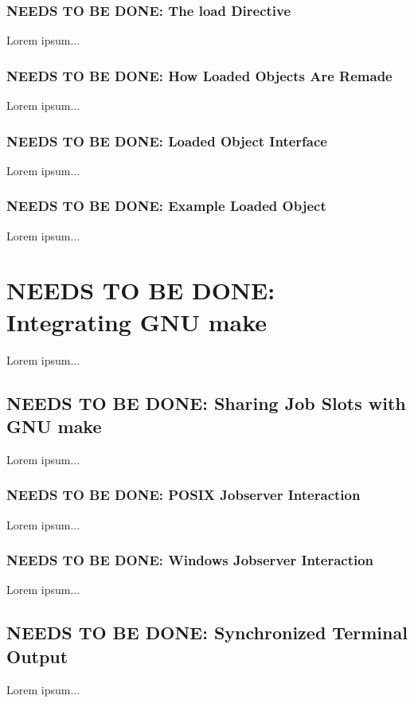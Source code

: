 \documentclass{charun}
\begin{document}
\begin{multicols*}{2}
\color{gray}
\subsubsection{NEEDS TO BE DONE: The load Directive}
Lorem ipsum...
\color{black}

\color{gray}
\subsubsection{NEEDS TO BE DONE: How Loaded Objects Are Remade}
Lorem ipsum...
\color{black}

\color{gray}
\subsubsection{NEEDS TO BE DONE: Loaded Object Interface}
Lorem ipsum...
\color{black}

\color{gray}
\subsubsection{NEEDS TO BE DONE: Example Loaded Object}
Lorem ipsum...
\color{black}


\color{gray}
\section{NEEDS TO BE DONE: Integrating GNU make}
Lorem ipsum...
\color{black}


\color{gray}
\subsection{NEEDS TO BE DONE: Sharing Job Slots with GNU make}
Lorem ipsum...
\color{black}

\color{gray}
\subsubsection{NEEDS TO BE DONE: POSIX Jobserver Interaction}
Lorem ipsum...
\color{black}

\color{gray}
\subsubsection{NEEDS TO BE DONE: Windows Jobserver Interaction}
Lorem ipsum...
\color{black}

\color{gray}
\subsection{NEEDS TO BE DONE: Synchronized Terminal Output}
Lorem ipsum...
\color{black}



\end{multicols*}
\end{document}
